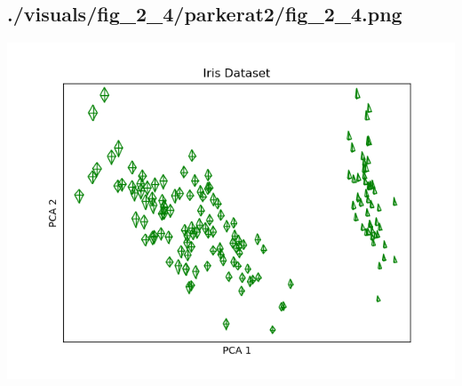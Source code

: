 \documentclass{report}
\begin{document}
    \subsection{./visuals/fig\_2\_4/parkerat2/fig\_2\_4.png}
    \includegraphics[width=\textwidth]{.././visuals/fig_2_4/parkerat2/fig_2_4.png}
\end{document}
